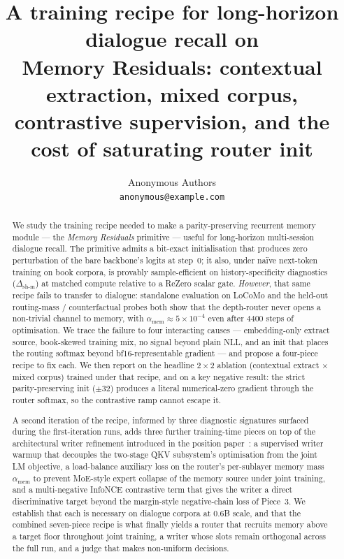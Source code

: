 \documentclass{article}
\title{A training recipe for long-horizon dialogue recall on\\
       Memory Residuals: contextual extraction, mixed corpus,\\
       contrastive supervision, and the cost of saturating router init}
\author{%
  Anonymous Authors\\
  \texttt{anonymous@example.com}%
}
\newcommand{\dsh}{\Delta_{\text{sh-m}}}
\newcommand{\amem}{\alpha_{\text{mem}}}
\begin{document}
\maketitle

\begin{abstract}
We study the training recipe needed to make a parity-preserving
recurrent memory module --- the \emph{Memory Residuals} primitive ---
useful for long-horizon multi-session dialogue recall. The primitive
admits a bit-exact initialisation that produces zero perturbation of
the bare backbone's logits at step~$0$; it also, under na\"ive
next-token training on book corpora, is provably sample-efficient
on history-specificity diagnostics ($\dsh$) at matched compute
relative to a ReZero scalar gate. \emph{However}, that same recipe
fails to transfer to dialogue: standalone evaluation on LoCoMo and
the held-out routing-mass / counterfactual probes both show that the
depth-router never opens a non-trivial channel to memory, with
$\amem \approx 5\!\times\!10^{-4}$ even after $4400$ steps of
optimisation. We trace the failure to four interacting causes ---
embedding-only extract source, book-skewed training mix,
no signal beyond plain NLL, and an init that places the routing
softmax beyond bf16-representable gradient --- and propose a
four-piece recipe to fix each. We then report on the headline
$2\!\times\!2$ ablation (contextual extract $\times$ mixed corpus)
trained under that recipe, and on a key negative result: the strict
parity-preserving init ($\pm 32$) produces a literal numerical-zero
gradient through the router softmax, so the contrastive ramp cannot
escape it.

A second iteration of the recipe, informed by three diagnostic
signatures surfaced during the first-iteration runs, adds three
further training-time pieces on top of the architectural writer
refinement introduced in the position paper~\cite{liu2025memres}:
a supervised writer warmup that decouples the two-stage QKV
subsystem's optimisation from the joint LM objective, a
load-balance auxiliary loss on the router's per-sublayer memory
mass $\amem$ to prevent MoE-style expert collapse of the memory
source under joint training, and a multi-negative InfoNCE
contrastive term that gives the writer a direct discriminative
target beyond the margin-style negative-chain loss of Piece~3.
We establish that each is necessary on dialogue corpora at
$0.6$B scale, and that the combined seven-piece recipe is what
finally yields a router that recruits memory above a target
floor throughout joint training, a writer whose slots remain
orthogonal across the full run, and a judge that makes non-uniform
decisions.
\end{abstract}
\end{document}
